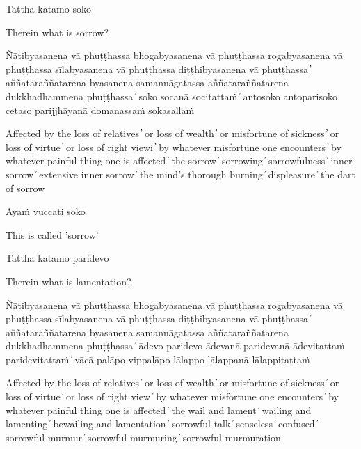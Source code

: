 Tattha katamo soko

\begin{cprenglish}
Therein what is sorrow?
\end{cprenglish}

Ñātibyasanena vā phuṭṭhassa bhogabyasanena vā phuṭṭhassa rogabyasanena vā phuṭṭhassa sīlabyasanena vā phuṭṭhassa diṭṭhibyasanena vā phuṭṭhassa  ̓  aññataraññatarena byasanena samannāgatassa aññataraññatarena dukkhadhammena phuṭṭhassa  ̓  soko socanā socitattaṁ  ̓  antosoko antoparisoko cetaso parijjhāyanā domanassaṁ sokasallaṁ

\begin{cprenglish}
Affected by the loss of relatives  ̓  or loss of wealth  ̓  or misfortune of sickness  ̓  or loss of virtue  ̓  or loss of right viewi  ̓  by whatever misfortune one encounters  ̓  by whatever painful thing one is affected  ̓  the sorrow  ̓  sorrowing  ̓  sorrowfulness  ̓  inner sorrow  ̓  extensive inner sorrow  ̓  the mind’s thorough burning  ̓  displeasure  ̓  the dart of sorrow
\end{cprenglish}

Ayaṁ vuccati soko

\begin{cprenglish}
This is called 'sorrow'
\end{cprenglish}

Tattha katamo paridevo

\begin{cprenglish}
Therein what is lamentation?
\end{cprenglish}

Ñātibyasanena vā phuṭṭhassa bhogabyasanena vā phuṭṭhassa rogabyasanena vā phuṭṭhassa sīlabyasanena vā phuṭṭhassa diṭṭhibyasanena vā phuṭṭhassa  ̓  aññataraññatarena byasanena samannāgatassa aññataraññatarena dukkhadhammena phuṭṭhassa  ̓  ādevo paridevo ādevanā paridevanā ādevitattaṁ paridevitattaṁ  ̓  vācā palāpo vippalāpo lālappo lālappanā lālappitattaṁ

\begin{cprenglish}
Affected by the loss of relatives  ̓  or loss of wealth  ̓  or misfortune of sickness  ̓  or loss of virtue  ̓  or loss of right view  ̓  by whatever misfortune one encounters  ̓  by whatever painful thing one is affected  ̓  the wail and lament  ̓  wailing and lamenting  ̓  bewailing and lamentation  ̓  sorrowful talk  ̓  senseless  ̓  confused  ̓  sorrowful murmur  ̓  sorrowful murmuring  ̓  sorrowful murmuration
\end{cprenglish}

